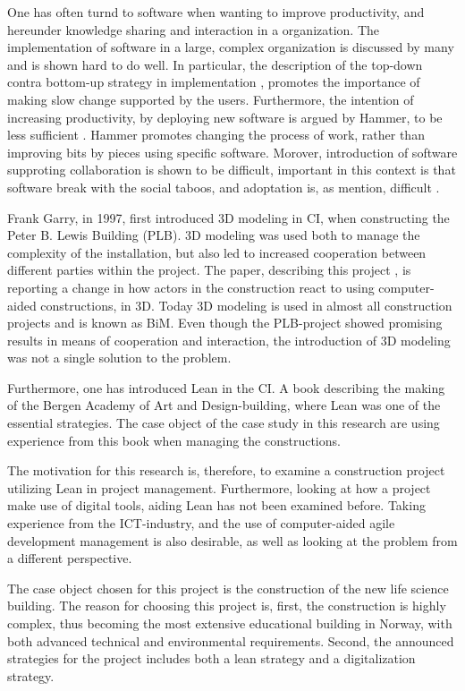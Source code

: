 One has often turnd to software when wanting to improve productivity, and hereunder knowledge sharing and interaction in a organization. The implementation of software in a large, complex organization is discussed by many and is shown hard to do well. In particular, the description of the top-down contra bottom-up strategy in implementation \cite{Robey&Sahay}, promotes the importance of making slow change supported by the users. Furthermore, the intention of increasing productivity, by deploying new software is argued by Hammer, to be less sufficient \cite{hammer1990reengineering}. Hammer promotes changing the process of work, rather than improving bits by pieces using specific software. Morover, introduction of software supproting collaboration is shown to be difficult, important in this context is that software break with the social taboos, and adoptation is, as mention, difficult \cite{Grudin}. 

Frank Garry, in 1997, first introduced 3D modeling in CI, when constructing the Peter B. Lewis Building (PLB). 3D modeling was used both to manage the complexity of the installation, but also led to increased cooperation between different parties within the project. The paper, describing this project \cite{frank_gehry}, is reporting a change in how actors in the construction react to using computer-aided constructions, in 3D. Today 3D modeling is used in almost all construction projects and is known as BiM. Even though the PLB-project showed promising results in means of cooperation and interaction, the introduction of 3D modeling was not a single solution to the problem.

Furthermore, one has introduced Lean in the CI. A book \cite{lean_i_praksis} describing the making of the Bergen Academy of Art and Design-building, where Lean was one of the essential strategies. The case object of the case study in this research are using experience from this book when managing the constructions. 

The motivation for this research is, therefore, to examine a construction project utilizing Lean in project management. Furthermore, looking at how a project make use of digital tools, aiding Lean has not been examined before. Taking experience from the ICT-industry, and the use of computer-aided agile development management is also desirable, as well as looking at the problem from a different perspective.

The case object chosen for this project is the construction of the new life science building. The reason for choosing this project is, first, the construction is highly complex, thus becoming the most extensive educational building in Norway, with both advanced technical and environmental requirements. Second, the announced strategies for the project includes both a lean strategy and a digitalization strategy. 

